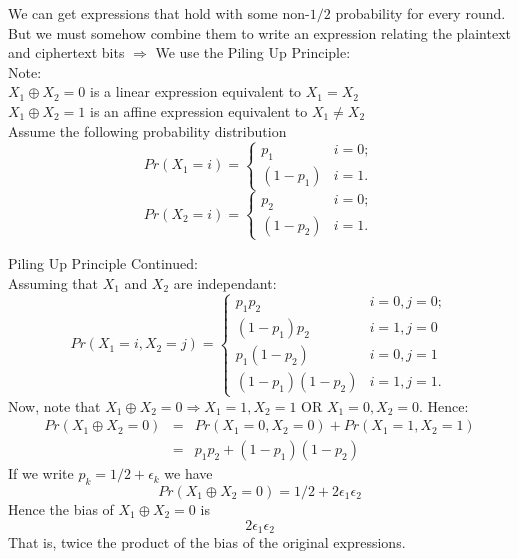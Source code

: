 \documentclass[9pt]{beamer}
\begin{document}
\begin{frame}
We can get expressions that hold with some non-$1/2$ probability for every round. But we must somehow combine them to write an expression relating the plaintext and ciphertext bits $\Rightarrow$ We use the Piling Up Principle:\\
\vspace{5mm}
Note: \\
$X_1 \oplus X_2 = 0$ is a linear expression equivalent to $X_1 = X_2$\\
$X_1 \oplus X_2 = 1$ is an affine expression equivalent to $X_1 \neq X_2$\\
\vspace{5mm}
Assume the following probability distribution
\[ Pr(X_1 = i)  = \left\{ \begin{array}{ll}
         p_1 & \mbox{$i = 0$};\\
         (1 - p_1) & \mbox{$i = 1$}.\end{array} \right. \] 
\[ Pr(X_2 = i)  = \left\{ \begin{array}{ll}
         p_2 & \mbox{$i = 0$};\\
         (1 - p_2) & \mbox{$i = 1$}.\end{array} \right. \] 
\end{frame}

\begin{frame}
Piling Up Principle Continued:\\
\vspace{5mm}
Assuming that $X_1$ and $X_2$ are independant:
\[ Pr(X_1 = i, X_2 = j)  = \left\{ \begin{array}{ll}
         p_1 p_2 & \mbox{$i = 0, j = 0$};\\
         (1 - p_1) p_2 & \mbox{$i = 1, j = 0$} \\
			p_1 (1 - p_2) & \mbox{$i = 0, j = 1$} \\
			(1 - p_1)(1 - p_2) & \mbox{$i = 1, j = 1$}.\end{array} \right. \] 
Now, note that $X_1 \oplus X_2 = 0 \Rightarrow X_1 = 1, X_2 =1$ OR $X_1 = 0, X_2 = 0$. Hence:
\begin{eqnarray*}
 Pr(X_1 \oplus X_2 = 0) & = & Pr(X_1=0,X_2=0) + Pr(X_1=1,X_2=1) \\
								& = & p_1p_2 + (1 - p_1)(1-p_2)
\end{eqnarray*}
If we write $p_k = 1/2 + \epsilon_k$ we have
\[ Pr(X_1 \oplus X_2 = 0) = 1/2 + 2\epsilon_1 \epsilon_2 \]
Hence the bias of $X_1 \oplus X_2 = 0$ is 
\[ 2 \epsilon_1 \epsilon_2 \]
That is, twice the product of the bias of the original expressions.
\end{frame}
\end{document}
